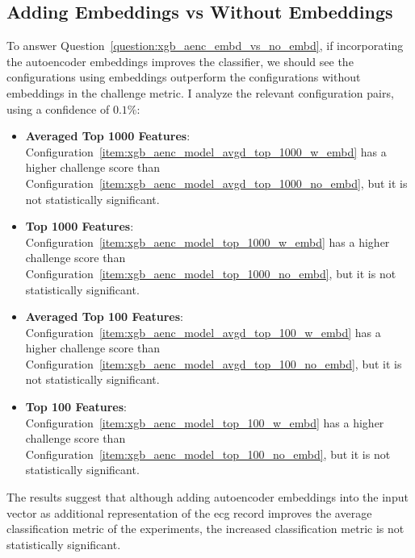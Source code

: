 \documentclass[\main/thesis.tex]{subfiles}
\begin{document}
\subsection{Adding Embeddings vs Without Embeddings}
To answer Question~\ref{question:xgb_aenc_embd_vs_no_embd}, if incorporating the autoencoder embeddings improves the classifier, we should see the configurations using embeddings outperform the configurations without embeddings in the challenge metric. 
I analyze the relevant configuration pairs, using a confidence of $0.1\%$:
\begin{itemize}
    \item \textbf{Averaged Top 1000 Features}: Configuration~\ref{item:xgb_aenc_model_avgd_top_1000_w_embd} has a higher challenge score than Configuration~\ref{item:xgb_aenc_model_avgd_top_1000_no_embd}, but it is not statistically significant.
    \item \textbf{Top 1000 Features}: Configuration~\ref{item:xgb_aenc_model_top_1000_w_embd} has a higher challenge score than Configuration~\ref{item:xgb_aenc_model_top_1000_no_embd}, but it is not statistically significant.
    \item \textbf{Averaged Top 100 Features}: Configuration~\ref{item:xgb_aenc_model_avgd_top_100_w_embd} has a higher challenge score than Configuration~\ref{item:xgb_aenc_model_avgd_top_100_no_embd}, but it is not statistically significant.
    \item \textbf{Top 100 Features}: Configuration~\ref{item:xgb_aenc_model_top_100_w_embd} has a higher challenge score than Configuration~\ref{item:xgb_aenc_model_top_100_no_embd}, but it is not statistically significant.
\end{itemize}

The results suggest that although adding autoencoder embeddings into the input vector as additional representation of the \gls{ecg} record improves the average classification metric of the experiments, the increased classification metric is not statistically significant.
\end{document}
